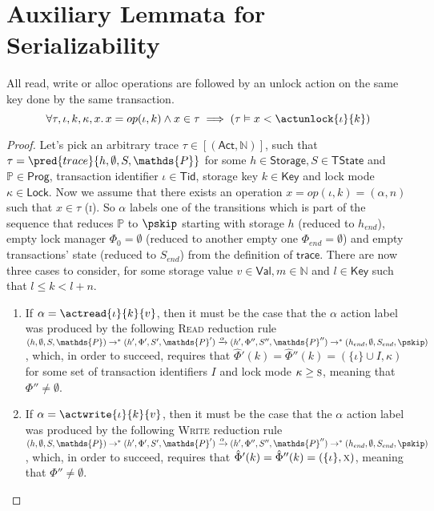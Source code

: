 \section{Auxiliary Lemmata for Serializability}

\begin{lem}
	\label{lem:unlock}
	All read, write or alloc operations are followed by an unlock action on the same key done by the same transaction.
	\[
		\forall \tau, \iota, k, \kappa, x \ldotp
		x = op(\iota, k) \land x \in \tau \implies \left( \tau \vDash x < \actunlock{\iota}{k} \right)
	\]
	
	\begin{proof}
	Let's pick an arbitrary trace $\tau \in \mathsf{[(Act, \mathds{N})]}$, such that $\tau = \pred{trace}{h, \emptyset, S, \mathds{P}}$ for some $h \in \mathsf{Storage}, S \in \mathsf{TState}$ and $\mathds{P} \in \mathsf{Prog}$, transaction identifier $\iota \in \mathsf{Tid}$, storage key $k \in \mathsf{Key}$ and lock mode $\kappa \in \mathsf{Lock}$. Now we assume that there exists an operation $x = op(\iota, k) = (\alpha, n)$ such that $x \in \tau$ (\textsc{i}). So $\alpha$ labels one of the transitions which is part of the sequence that reduces $\mathds{P}$ to $\pskip$ starting with storage $h$ (reduced to $h_{end}$), empty lock manager $\Phi_0 = \emptyset$ (reduced to another empty one $\Phi_{end} = \emptyset$) and empty transactions' state (reduced to $S_{end}$) from the definition of $\mathsf{trace}$. There are now three cases to consider, for some storage value $v \in \mathsf{Val}, m \in \mathds{N}$ and $l \in \mathsf{Key}$ such that $l \leq k < l + n$.
	\begin{enumerate}
		\item If $\alpha = \actread{\iota}{k}{v}$, then it must be the case that the $\alpha$ action label was produced by the following \textsc{Read} reduction rule $(h, \emptyset, S, \mathds{P}) \rightarrow^* (h', \Phi', S', \mathds{P}') \xrightarrow{\alpha} (h', \Phi'', S'', \mathds{P}'') \rightarrow^* (h_{end}, \emptyset, S_{end}, \pskip)$, which, in order to succeed, requires that $\hat{\Phi}'(k) = \hat{\Phi}''(k) = (\{ \iota \} \cup I, \kappa)$ for some set of transaction identifiers $I$ and lock mode $\kappa \geq \textsc{s}$, meaning that $\Phi'' \neq \emptyset$.
		
		\item If $\alpha = \actwrite{\iota}{k}{v}$, then it must be the case that the $\alpha$ action label was produced by the following \textsc{Write} reduction rule $(h, \emptyset, S, \mathds{P}) \rightarrow^* (h', \Phi', S', \mathds{P}') \xrightarrow{\alpha} (h', \Phi'', S'', \mathds{P}'') \rightarrow^* (h_{end}, \emptyset, S_{end}, \pskip)$, which, in order to succeed, requires that $\hat{\Phi}'(k) = \hat{\Phi}''(k) = (\{ \iota \}, \textsc{x})$, meaning that $\Phi'' \neq \emptyset$.
		

\end{enumerate}
\end{proof}
\end{lem}
